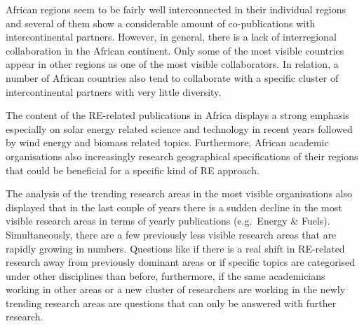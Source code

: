 \documentclass[
]{book}
\begin{document}
African regions seem to be fairly well interconnected in their individual regions and several of them show a considerable amount of co-publications with intercontinental partners. However, in general, there is a lack of interregional collaboration in the African continent. Only some of the most visible countries appear in other regions as one of the most visible collaborators. In relation, a number of African countries also tend to collaborate with a specific cluster of intercontinental partners with very little diversity.

The content of the RE-related publications in Africa displays a strong emphasis especially on solar energy related science and technology in recent years followed by wind energy and biomass related topics. Furthermore, African academic organisations also increasingly research geographical specifications of their regions that could be beneficial for a specific kind of RE approach.

The analysis of the trending research areas in the most visible organisations also displayed that in the last couple of years there is a sudden decline in the most visible research areas in terms of yearly publications (e.g.~Energy \& Fuels). Simultaneously, there are a few previously less visible research areas that are rapidly growing in numbers. Questions like if there is a real shift in RE-related research away from previously dominant areas or if specific topics are categorised under other disciplines than before, furthermore, if the same academicians working in other areas or a new cluster of researchers are working in the newly trending research areas are questions that can only be answered with further research.

  
\end{document}
